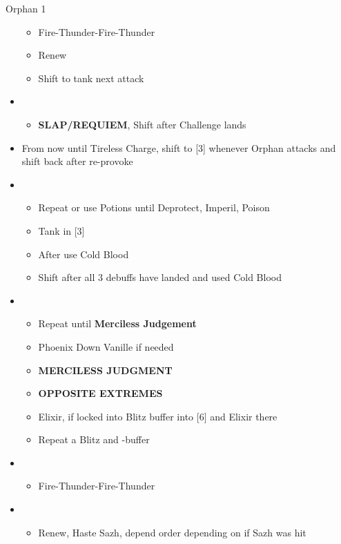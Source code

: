 \begin{battle}{Orphan 1}
\begin{multicols}{2}
\begin{itemize}
\begin{itemize}
				      \item Fire-Thunder-Fire-Thunder
				      \item Renew
				      \item Shift to tank next attack
			      \end{itemize}
			\item \third
			      \begin{itemize}
				      \item \textbf{SLAP/REQUIEM}, Shift after Challenge lands
			      \end{itemize}
			      \vfill\null
			      \columnbreak
			\item From now until Tireless Charge, shift to [3] whenever Orphan attacks and shift back after re-provoke
			\item \fifth
			      \begin{itemize}
				      \item Repeat or use Potions until Deprotect, Imperil, Poison
				      \item Tank in [3]
				      \item After \stagger use Cold Blood
				      \item Shift after all 3 debuffs have landed and used Cold Blood
			      \end{itemize}
			\item \first
			      \begin{itemize}
				      \item Repeat until \textbf{Merciless Judgement}
				      \item Phoenix Down Vanille if needed
				      \item \textbf{MERCILESS JUDGMENT}
				      \item \textbf{OPPOSITE EXTREMES}
				      \item Elixir, if locked into Blitz buffer into [6] and Elixir there
				      \item Repeat a Blitz and \rav-buffer
			      \end{itemize}
			\item \sixth
			      \begin{itemize}
				      \item Fire-Thunder-Fire-Thunder
			      \end{itemize}
			\item \fourth
			      \begin{itemize}
				      \item Renew, Haste Sazh, depend order depending on if Sazh was hit
			      \end{itemize}

\end{itemize}
\end{multicols}
\end{battle}
